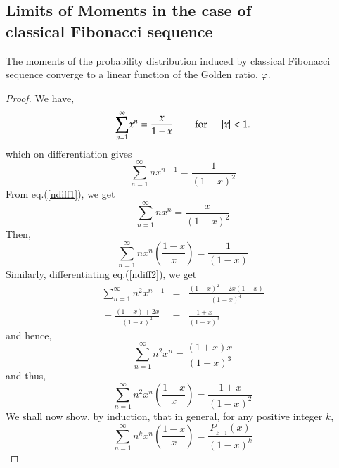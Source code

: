 \begin{multicols}{2}
\subsection{Limits of Moments in  the case of\\ classical Fibonacci sequence}\label{subsection-13.1}
The moments of the probability distribution induced by classical Fibonacci sequence converge to a linear function of the Golden ratio, $\varphi$.
\begin{proof}\renewcommand{\qedsymbol}{} 
We have,
\begin{equation}\nonumber
\displaystyle{\sum_{n=1}^{\infty}}x^n = \displaystyle{\frac{x}{1-x}} \hspace{0.3in} \textup{for} \hspace{0.2in} |x| < 1.
\end{equation}
which on differentiation gives
\begin{equation}
\displaystyle{\sum_{n=1}^{\infty}}nx^{n-1} = \displaystyle{\frac{1}{(1-x)^2}}\label{eq-13.4}
\end{equation}
From eq.(\ref{ndiff1}), we get
\begin{equation}
\displaystyle{\sum_{n=1}^{\infty}}nx^{n} = \displaystyle{\frac{x}{(1-x)^2}}\label{eq-13.5}
\end{equation}
Then, 
\begin{equation}
\displaystyle{\sum_{n=1}^{\infty}}nx^{n}\left(\displaystyle{\frac{1-x}{x}}\right) = \displaystyle{\frac{1}{(1-x)}}\label{eq-13.6}
\end{equation}
Similarly, differentiating eq.(\ref{ndiff2}), we get
\begin{eqnarray}
\displaystyle{\sum_{n=1}^{\infty}}n^2x^{n-1} &=& \displaystyle{\frac{(1-x)^2 + 2x(1-x)}{(1-x)^4}}\nonumber\\
= \displaystyle{\frac{(1-x)+2x}{(1-x)^3}}&=& \displaystyle{\frac{1+x}{(1-x)^3}}\label{eq-13.7}
\end{eqnarray}
and hence,
\begin{equation}\nonumber
\displaystyle{\sum_{n=1}^{\infty}}n^2x^{n} = \displaystyle{\frac{(1+x)x}{(1-x)^3}}
\end{equation}
and thus,
\begin{equation}
\displaystyle{\sum_{n=1}^{\infty}}n^2x^n\left(\frac{1-x}{x}\right) = \displaystyle{\frac{1+x}{(1-x)^2}}\label{eq-13.8}
\end{equation}
We shall now show, by induction, that in general, for any positive integer $k$,
\begin{equation}
\displaystyle{\sum_{n=1}^{\infty}}n^k x^n \left(\frac{1-x}{x}\right) = \displaystyle{\frac{P_{_{k-1}}(x)}{(1-x)^k}}\label{eq-13.9}

\end{equation}
\end{proof}
\end{multicols}
